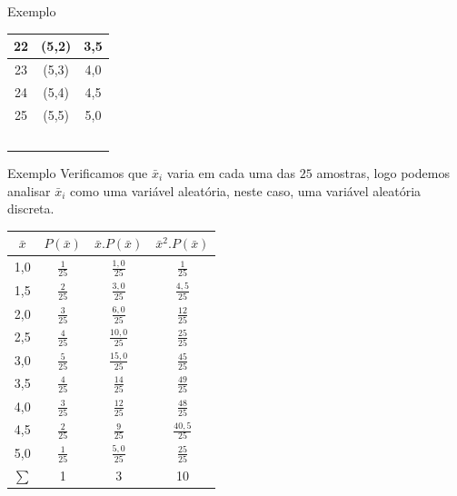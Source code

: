 \documentclass[hyperref={pdfpagelabels=false}]{beamer}
\begin{document}
\begin{frame}{Exemplo}
\begin{center}
\begin{tabular}{|c|c|c|}
		\hline 
		22 & (5,2) & 3,5 \\ 
		\hline 
		23 & (5,3) & 4,0 \\ 
		\hline 
		24 & (5,4) & 4,5 \\ 
		\hline 
		25 & (5,5) & 5,0 \\ 
		\hline 
		&  &  \\ 
		\hline 
		&  &  \\ 
		\hline 
		&  &  \\ 
		\hline 
		&  &  \\ 
		\hline 
		&  &  \\ 
		\hline 
	\end{tabular} 
	\end{center}
\end{frame}

\begin{frame}{Exemplo}
	Verificamos que $\bar{x}_i$ varia em cada uma das $25$ amostras, logo podemos analisar $\bar{x}_i$ como uma variável aleatória, neste caso, uma variável aleatória discreta. 
	\pause
	
	\begin{center}
	\begin{tiny}	
	\begin{tabular}{|c|c|c|c|}
		\hline 
		$\bar{x}$ & $P(\bar{x})$ & $\bar{x}.P(\bar{x})$ & $\bar{x}^2 . P(\bar{x})$ \\ 
		\hline 
		1,0 & $\displaystyle \frac{1}{25}$ & $\displaystyle \frac{1,0}{25}$ & $\displaystyle \frac{1}{25}$ \\ 
		\hline 
		1,5 & $\displaystyle \frac{2}{25}$ & $\displaystyle \frac{3,0}{25}$ & $\displaystyle \frac{4,5}{25}$ \\ 
		\hline 
		2,0 & $\displaystyle \frac{3}{25}$ & $\displaystyle \frac{6,0}{25}$ & $\displaystyle \frac{12}{25}$ \\ 
		\hline 
		2,5 & $\displaystyle \frac{4}{25}$ & $\displaystyle \frac{10,0}{25}$ & $\displaystyle \frac{25}{25}$ \\ 
		\hline 
		3,0 & $\displaystyle \frac{5}{25}$ & $\displaystyle \frac{15,0}{25}$ & $\displaystyle \frac{45}{25}$ \\ 
		\hline 
		3,5 & $\displaystyle \frac{4}{25}$ & $\displaystyle \frac{14}{25}$ & $\displaystyle \frac{49}{25}$ \\ 
		\hline 
		4,0 & $\displaystyle \frac{3}{25}$ & $\displaystyle \frac{12}{25}$ & $\displaystyle \frac{48}{25}$ \\ 
		\hline 
		4,5 & $\displaystyle \frac{2}{25}$ & $\displaystyle \frac{9}{25}$ & $\displaystyle \frac{40,5}{25}$ \\ 
		\hline 
		5,0 & $\displaystyle \frac{1}{25}$ & $\displaystyle \frac{5,0}{25}$ & $\displaystyle \frac{25}{25}$ \\ 
		\hline 
		$\displaystyle \sum$ & 1 & 3 & 10 \\ 
		\hline 
	\end{tabular} 
\end{tiny}
	\end{center}
\end{frame}
\end{document}
